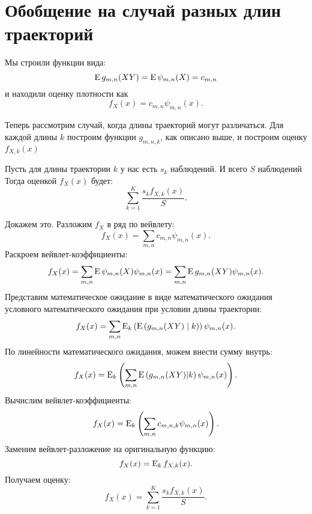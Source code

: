\documentclass[../paper.tex]{subfiles}
\begin{document}
\section{Обобщение на случай разных длин траекторий}
Мы строили функции вида:
\[
	\operatorname{E} g_{m,n}(XY) = \operatorname{E} \psi_{m,n}(X) = c_{m,n}
\] и находили оценку плотности как
\[
	f_X(x) = c_{m,n} \psi_{m,n}(x)
.\]

Теперь рассмотрим случай, когда длины траекторий могут различаться.
Для каждой длины $k$ построим функции $g_{m,n,k}$, как описано выше,
и построим оценку $f_{X,k}(x)$

Пусть для длины траектории $k$ у нас есть $s_k$ наблюдений. И всего $S$ наблюдений
Тогда оценкой $f_X(x)$ будет:
\[
	\sum_{k=1}^K \frac{s_k f_{X,k}(x)}{S}
.\]

Докажем это. Разложим $f_X$ в ряд по вейвлету:
\[
	f_X(x) = \sum_{m,n} c_{m,n} \psi_{m,n}(x).
\]
Раскроем вейвлет-коэффициенты:
\[
	f_X(x)
	= \sum_{m,n} \operatorname{E} \psi_{m,n}(X) \psi_{m,n}(x)
	= \sum_{m,n} \operatorname{E} g_{m,n}(XY) \psi_{m,n}(x)
.\]
Представим математическое ожидание в виде математического ожидания условного математического ожидания при условии длины траектории:
\[
	f_X(x) 
	= \sum_{m,n} \operatorname{E}_k \left(\operatorname{E} \left(g_{m,n}(XY) \mid k \right) \right ) \psi_{m,n}(x).
\]
По линейности математического ожидания, можем внести сумму внутрь:
\[
  f_X(x) = \operatorname{E}_k \left( \sum_{m,n} \operatorname{E} \left(g_{m,n}(XY) | k \right) \psi_{m,n}(x) \right).
\]
Вычислим вейвлет-коэффициенты:
\[
  f_X(x) = \operatorname{E}_k \left(\sum_{m,n} c_{m,n,k} \psi_{m,n}(x) \right).
\]
Заменим вейвлет-разложение на оригинальную функцию:
\[
  f_X(x) = \operatorname{E}_k f_{X,k}(x).
\]
Получаем оценку:
\[
  f_X(x) = \sum_{k=1}^K \frac{s_k f_{X,k}(x)}{S}.
\]
\end{document}
